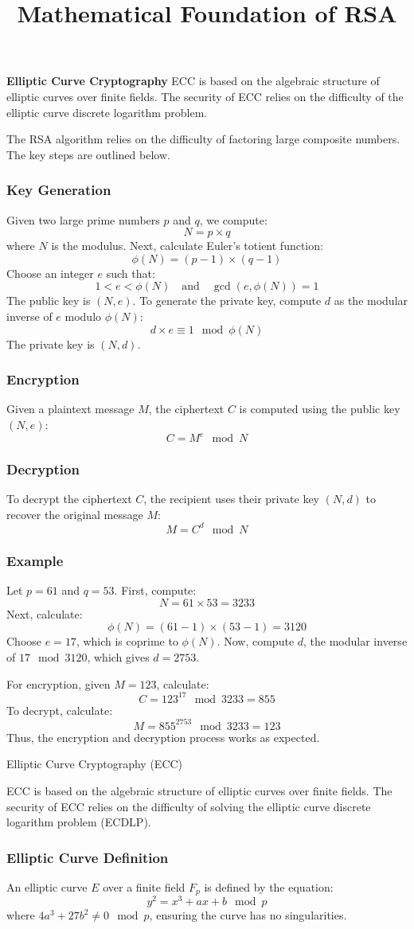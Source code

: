 \documentclass{beamer}
\begin{document}
\begin{frame}
\textbf{Elliptic Curve Cryptography}
ECC is based on the algebraic structure of elliptic curves over finite fields. The security of ECC relies on the difficulty of the elliptic curve discrete logarithm problem.
\end{frame}

\begin{frame}
\title{Mathematical Foundation of RSA}

The RSA algorithm relies on the difficulty of factoring large composite numbers. The key steps are outlined below.
\end{frame}
\begin{frame}
\frametitle{Key Generation}
Given two large prime numbers \( p \) and \( q \), we compute:
\[
N = p \times q
\]
where \( N \) is the modulus. Next, calculate Euler's totient function:
\[
\phi(N) = (p - 1) \times (q - 1)
\]
Choose an integer \( e \) such that:
\[
1 < e < \phi(N) \quad \text{and} \quad \gcd(e, \phi(N)) = 1
\]
The public key is \( (N, e) \). To generate the private key, compute \( d \) as the modular inverse of \( e \) modulo \( \phi(N) \):
\[
d \times e \equiv 1 \mod \phi(N)
\]
The private key is \( (N, d) \).
\end{frame}

\begin{frame}
\frametitle{Encryption}
Given a plaintext message \( M \), the ciphertext \( C \) is computed using the public key \( (N, e) \):
\[
C = M^e \mod N
\]

\frametitle{Decryption}
To decrypt the ciphertext \( C \), the recipient uses their private key \( (N, d) \) to recover the original message \( M \):
\[
M = C^d \mod N
\]
\end{frame}

\begin{frame}

\frametitle{Example}
Let \( p = 61 \) and \( q = 53 \). First, compute:
\[
N = 61 \times 53 = 3233
\]
Next, calculate:
\[
\phi(N) = (61 - 1) \times (53 - 1) = 3120
\]
Choose \( e = 17 \), which is coprime to \( \phi(N) \). Now, compute \( d \), the modular inverse of \( 17 \mod 3120 \), which gives \( d = 2753 \).

For encryption, given \( M = 123 \), calculate:
\[
C = 123^{17} \mod 3233 = 855
\]
To decrypt, calculate:
\[
M = 855^{2753} \mod 3233 = 123
\]
Thus, the encryption and decryption process works as expected.
\end{frame}

\begin{frame}{Elliptic Curve Cryptography (ECC)}
    
ECC is based on the algebraic structure of elliptic curves over finite fields. The security of ECC relies on the difficulty of solving the elliptic curve discrete logarithm problem (ECDLP).

\frametitle{Elliptic Curve Definition}
An elliptic curve \( E \) over a finite field \( F_p \) is defined by the equation:
\[
y^2 = x^3 + ax + b \mod p
\]
where \( 4a^3 + 27b^2 \neq 0 \mod p \), ensuring the curve has no singularities.
\end{frame}
\end{document}

